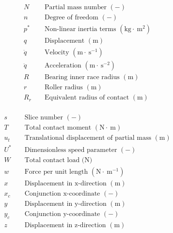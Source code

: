 \begin{align*}
	&N && \text { Partial mass number }(-) \\
	&n && \text { Degree of freedom }(-) \\
	&p^* && \text { Non-linear inertia terms }\left(\mathrm{kg} \cdot \mathrm{~m}^2\right) \\
	&q && \text { Displacement }(\mathrm{m}) \\
	&\ddot{q} && \text { Velocity }\left(\mathrm{m} \cdot \mathrm{~s}^{-1}\right) \\
	&\ddot{q} && \text { Acceleration }\left(\mathrm{m} \cdot \mathrm{~s}^{-2}\right) \\
	&R && \text { Bearing inner race radius }(\mathrm{m}) \\
	&r && \text { Roller radius }(\mathrm{m}) \\
	&R_r && \text { Equivalent radius of contact }(\mathrm{m}) \\
\end{align*}

\pagebreak

\begin{align*}
	&s && \text { Slice number }(-) \\
	&T && \text { Total contact moment }(\mathrm{N} \cdot \mathrm{~m}) \\
	&u_t && \text { Translational displacement of partial mass }(\mathrm{m}) \\
	&U^* && \text { Dimensionless speed parameter }(-) \\
	&W && \text { Total contact load (N) } \\
	&w && \text { Force per unit length }\left(\mathrm{N} \cdot \mathrm{~m}^{-1}\right) \\
	&x && \text { Displacement in x-direction }(\mathrm{m}) \\
	&x_c && \text { Conjunction } \mathrm{x} \text {-coordinate }(-) \\
	&y && \text { Displacement in y-direction }(\mathrm{m}) \\
	&y_c && \text { Conjunction y-coordinate }(-) \\
	&z && \text { Displacement in z-direction }(\mathrm{m})
\end{align*}

